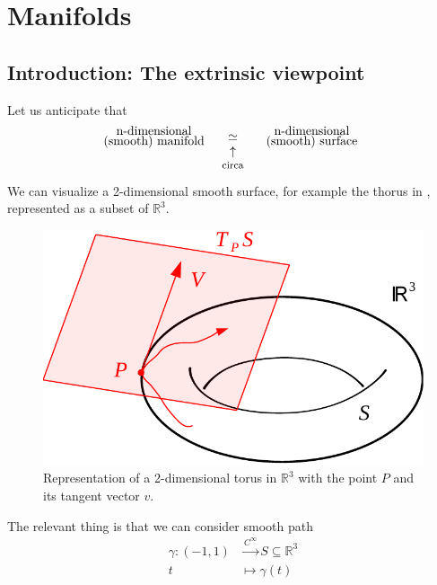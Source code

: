 \documentclass[../main.tex]{subfiles}
\begin{document}
{}
\setchapterpreamble[u]{\margintoc}
\chapter[Manifolds]{Manifolds\footnotemark[0]}
\section[The extrinsic viewpoint]{Introduction: The extrinsic viewpoint}
Let us anticipate that 
\[
\text{\parbox{4 cm}{\centering n-dimensional \\[-4pt]  (smooth) manifold}}\underset{\mathclap{\tikz \node {$\uparrow$} node [below=1ex] {\footnotesize circa};}}{\simeq}\text{\parbox{4 cm}{\centering n-dimensional \\[-4pt]  (smooth) surface}}
\]
We can visualize a 2-dimensional smooth surface, for example the thorus in , represented as a subset of $\mathbb{R}^3$. 
\begin{figure}[H]
	\includegraphics[width=1\textwidth]{images/Toro.pdf}
	\caption[Torus]{Representation of a 2-dimensional torus in $\mathbb{R}^3$ with the point $P$ and its tangent vector $v$.}
\end{figure}
The relevant thing is that we can consider smooth path
\[
\begin{split}
\gamma:(-1,1)&\xrightarrow{C^\infty} S\subseteq\mathbb{R}^3\\
t &\mapsto \gamma(t)
\end{split}
\]
\end{document}
